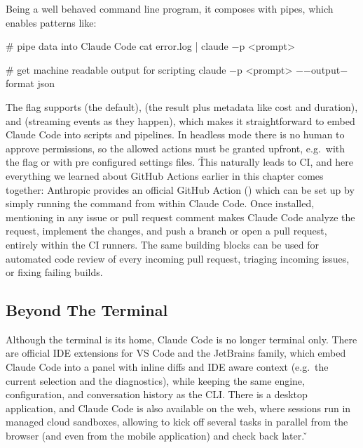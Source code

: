 Being a well behaved command line program, it composes with pipes, which enables patterns like:

\begin{bash}
# pipe data into Claude Code
cat error.log | claude $-$p <prompt>
\end{bash}

\begin{bash}
# get machine readable output for scripting
claude $-$p <prompt> $-$$-$output$-$format json
\end{bash}

The  flag supports  (the default),  (the result plus metadata like cost
and duration), and  (streaming events as they happen), which makes it straightforward to embed
Claude Code into scripts and pipelines. In headless mode there is no human to approve permissions, so the allowed
actions must be granted upfront, e.g.\ with the  flag or with pre configured settings files. \v

This naturally leads to CI, and here everything we learned about GitHub Actions earlier in this chapter comes
together: Anthropic provides an official GitHub Action () which can be set up
by simply running the  command from within Claude Code. Once installed, mentioning
 in any issue or pull request comment makes Claude Code analyze the request, implement the changes, and
push a branch or open a pull request, entirely within the CI runners. The same building blocks can be used for
automated code review of every incoming pull request, triaging incoming issues, or fixing failing builds.

\subsection{Beyond The Terminal}

Although the terminal is its home, Claude Code is no longer terminal only. There are official IDE extensions for VS
Code and the JetBrains family, which embed Claude Code into a panel with inline diffs and IDE aware context (e.g.\
the current selection and the diagnostics), while keeping the same engine, configuration, and conversation history as
the CLI. There is a desktop application, and Claude Code is also available on the web, where sessions run in managed
cloud sandboxes, allowing to kick off several tasks in parallel from the browser (and even from the mobile
application) and check back later. \v

